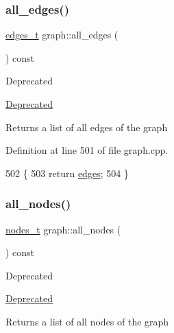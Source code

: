 \subsubsection{\texorpdfstring{all\+\_\+edges()}{all\_edges()}}
{\footnotesize\ttfamily \mbox{\hyperlink{edge_8h_a8f9587479bda6cf612c103494b3858e3}{edges\+\_\+t}} graph\+::all\+\_\+edges (\begin{DoxyParamCaption}{ }\end{DoxyParamCaption}) const\hspace{0.3cm}{\ttfamily [inherited]}}

\begin{DoxyRefDesc}{Deprecated}
\item[\mbox{\hyperlink{deprecated__deprecated000004}{Deprecated}}]\end{DoxyRefDesc}
\begin{DoxyReturn}{Returns}
a list of all edges of the graph 
\end{DoxyReturn}


Definition at line 501 of file graph.\+cpp.


\begin{DoxyCode}
502 \{
503     \textcolor{keywordflow}{return} \mbox{\hyperlink{classgraph_ab5b1c610cca1bcf72b05aacc28a48153}{edges}};
504 \}
\end{DoxyCode}
\mbox{\label{classgraph_a268af566b8df2cbaede1319ad370dc7e}} 
\subsubsection{\texorpdfstring{all\+\_\+nodes()}{all\_nodes()}}
{\footnotesize\ttfamily \mbox{\hyperlink{edge_8h_a22ac17689106ba21a84e7bc54d1199d6}{nodes\+\_\+t}} graph\+::all\+\_\+nodes (\begin{DoxyParamCaption}{ }\end{DoxyParamCaption}) const\hspace{0.3cm}{\ttfamily [inherited]}}

\begin{DoxyRefDesc}{Deprecated}
\item[\mbox{\hyperlink{deprecated__deprecated000003}{Deprecated}}]\end{DoxyRefDesc}
\begin{DoxyReturn}{Returns}
a list of all nodes of the graph 
\end{DoxyReturn}


